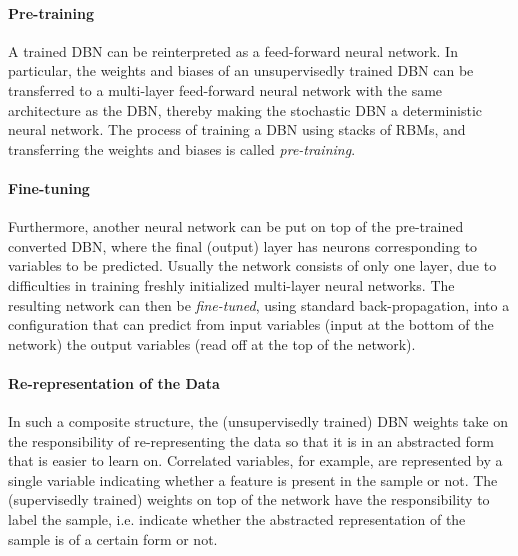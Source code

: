 \paragraph{Pre-training}

A trained DBN can be reinterpreted as a feed-forward neural network.
In particular, the weights and biases of an unsupervisedly trained
DBN can be transferred to a multi-layer feed-forward neural network
with the same architecture as the DBN, thereby making the stochastic
DBN a deterministic neural network.  The process of training a DBN
using stacks of RBMs, and transferring the weights and biases is called
\emph{pre-training}.

\paragraph{Fine-tuning}

Furthermore, another neural network can be put on top of the pre-trained
converted DBN, where the final (output) layer has neurons corresponding
to variables to be predicted. Usually the network consists of only
one layer, due to difficulties in training freshly initialized multi-layer
neural networks. The resulting network can then be \emph{fine-tuned},
using standard back-propagation, into a configuration that can predict
from input variables (input at the bottom of the network) the output
variables (read off at the top of the network).

\paragraph{Re-representation of the Data}

In such a composite structure, the (unsupervisedly trained) DBN weights
take on the responsibility of re-representing the data so that it
is in an abstracted form that is easier to learn on. Correlated variables,
for example, are represented by a single variable indicating whether
a feature is present in the sample or not. The (supervisedly trained)
weights on top of the network have the responsibility to label the
sample, i.e. indicate whether the abstracted representation of the
sample is of a certain form or not.


